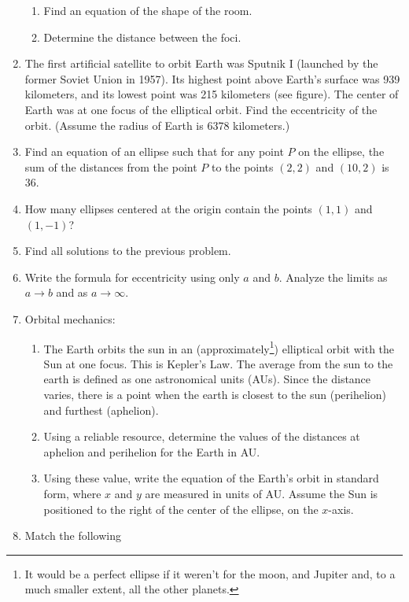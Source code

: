 \documentclass[
]{article}
\providecommand{\tightlist}{%
  \setlength{\itemsep}{0pt}\setlength{\parskip}{0pt}}
\def\tightlist{}
\begin{document}
\begin{enumerate}
  \begin{enumerate}
  \tightlist
  \item
    Find an equation of the shape of the room.
  \item
    Determine the distance between the foci.
  \end{enumerate}
\item
  The first artificial satellite to orbit Earth was Sputnik I (launched
  by the former Soviet Union in 1957). Its highest point above Earth's
  surface was 939 kilometers, and its lowest point was 215 kilometers
  (see figure). The center of Earth was at one focus of the elliptical
  orbit. Find the eccentricity of the orbit. (Assume the radius of Earth
  is 6378 kilometers.)
\item
  Find an equation of an ellipse such that for any point \(P\) on the
  ellipse, the sum of the distances from the point \(P\) to the points
  \((2, 2)\) and \((10, 2)\) is 36.
\item
  How many ellipses centered at the origin contain the points \((1,1)\)
  and \((1,-1)\)?
\item
  Find all solutions to the previous problem.
\item
  Write the formula for eccentricity using only \(a\) and \(b\). Analyze
  the limits as \(a \to b\) and as \(a \to \infty\).
\item
  Orbital mechanics:

  \begin{enumerate}
  \tightlist
  \item
    The Earth orbits the sun in an (approximately\footnote{It would be a
      perfect ellipse if it weren't for the moon, and Jupiter and, to a
      much smaller extent, all the other planets.}) elliptical orbit
    with the Sun at one focus. This is Kepler's Law. The average from
    the sun to the earth is defined as one astronomical units (AUs).
    Since the distance varies, there is a point when the earth is
    closest to the sun (perihelion) and furthest (aphelion).
  \item
    Using a reliable resource, determine the values of the distances at
    aphelion and perihelion for the Earth in AU.
  \item
    Using these value, write the equation of the Earth's orbit in
    standard form, where \(x\) and \(y\) are measured in units of AU.
    Assume the Sun is positioned to the right of the center of the
    ellipse, on the \(x\)-axis.
  \end{enumerate}
\item
  Match the following
\end{enumerate}
\end{document}
